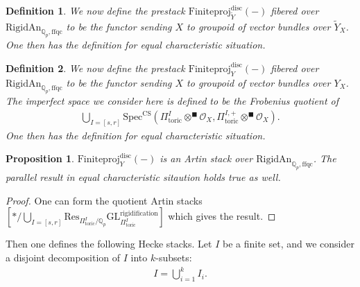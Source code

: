 \documentclass[12pt]{article}
\newtheorem{definition}{Definition}
\newtheorem{proposition}{Proposition}
\begin{document}
\begin{definition}
We now define the prestack $\mathrm{Finiteproj}^\mathrm{disc}_{\widetilde{Y}}(-)$ fibered over $\mathrm{RigidAn}_{\mathbb{Q}_p,\mathrm{ffqc}}$ to be the functor sending $X$ to groupoid of vector bundles over $\widetilde{Y}_X$. One then has the definition for equal characteristic situation. 
\end{definition}


\begin{definition}
We now define the prestack $\mathrm{Finiteproj}^\mathrm{disc}_{Y}(-)$ fibered over $\mathrm{RigidAn}_{\mathbb{Q}_p,\mathrm{ffqc}}$ to be the functor sending $X$ to groupoid of vector bundles over $Y_X$. The imperfect space we consider here is defined to be the Frobenius quotient of
\begin{align}
\bigcup_{I=[s,r]}\mathrm{Spec}^\mathrm{CS}({\Pi}^I_{\mathrm{toric}}\otimes^\blacksquare \mathcal{O}_X,{\Pi}_{\mathrm{toric}}^{I,+}\otimes^\blacksquare \mathcal{O}_X).	
\end{align}
One then has the definition for equal characteristic situation. 
\end{definition} 


\begin{proposition}
$\mathrm{Finiteproj}^\mathrm{disc}_{Y}(-)$ is an Artin stack over $\mathrm{RigidAn}_{\mathbb{Q}_p,\mathrm{ffqc}}$. The parallel result in equal characteristic sitaution holds true as well.
\end{proposition}

\begin{proof}
One can form the quotient Artin stacks $[*/\bigcup_{I=[s,r]}\mathrm{Res}_{\Pi^I_\mathrm{toric}/\mathbb{Q}_p}\mathrm{GL}^\mathrm{rigidification}_{\Pi^I_\mathrm{toric}}]$ which gives the result.	
\end{proof}




\indent Then one defines the following Hecke stacks. Let $I$ be a finite set, and we consider a disjoint decomposition of $I$ into $k$-subsets:
\begin{align}
I=\bigcup_{i=1}^k I_i.	
\end{align}
\end{document}
